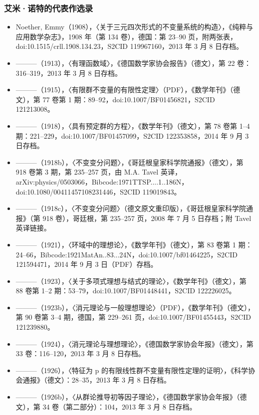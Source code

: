 \subsubsection{艾米·诺特的代表作选录}
\begin{itemize}
\item Noether, Emmy（1908），〈关于三元四次形式的不变量系统的构造〉，《纯粹与应用数学杂志》，1908 年（第 134 卷），德国：第 23–90 页，附两张表，doi:10.1515/crll.1908.134.23，S2CID 119967160，2013 年 3 月 8 日存档。
\item ———（1913），〈有理函数域〉，《德国数学家协会报告》（德文），第 22 卷：316–319，2013 年 3 月 8 日存档。
\item ———（1915），〈有限群不变量的有限性定理〉（PDF），《数学年刊》（德文），第 77 卷第 1 期：89–92，doi:10.1007/BF01456821，S2CID 121213008。
\item ———（1918），〈具有预定群的方程〉，《数学年刊》（德文），第 78 卷第 1–4 期：221–229，doi:10.1007/BF01457099，S2CID 122353858，2014 年 9 月 3 日存档。
\item ———（1918b），〈不变变分问题〉，《哥廷根皇家科学院通报》（德文），第 918 卷第 3 期，第 235–257 页，由 M.A. Tavel 英译，arXiv:physics/0503066，Bibcode:1971TTSP....1..186N，doi:10.1080/00411457108231446，S2CID 119019843。
\item ———（1918c），〈不变变分问题〉（德文原文重印版），《哥廷根皇家科学院通报》（第 918 卷），哥廷根，第 235–257 页，2008 年 7 月 5 日存档；附 Tavel 英译链接。
\item ———（1921），〈环域中的理想论〉，《数学年刊》（德文），第 83 卷第 1 期：24–66，Bibcode:1921MatAn..83...24N，doi:10.1007/bf01464225，S2CID 121594471，2014 年 9 月 3 日（PDF）存档。
\item ———（1923），〈关于多项式理想与结式的理论〉，《数学年刊》（德文），第 88 卷第 1–2 期：53–79，doi:10.1007/BF01448441，S2CID 122226025。
\item ———（1923b），〈消元理论与一般理想理论〉（PDF），《数学年刊》（德文），第 90 卷第 3–4 期，德国，第 229–261 页，doi:10.1007/BF01455443，S2CID 121239880。
\item ———（1924），〈消元理论与理想理论〉，《德国数学家协会年报》（德文），第 33 卷：116–120，2013 年 3 月 8 日存档。
\item ———（1926），〈特征为 p 的有限线性群不变量有限性定理的证明〉，《科学协会通报》（德文）：28–35，2013 年 3 月 8 日存档。
\item ———（1926b），〈从群论推导初等因子理论〉，《德国数学家协会年报》（德文），第 34 卷（第二部分）：104，2013 年 3 月 8 日存档。

\end{itemize}
